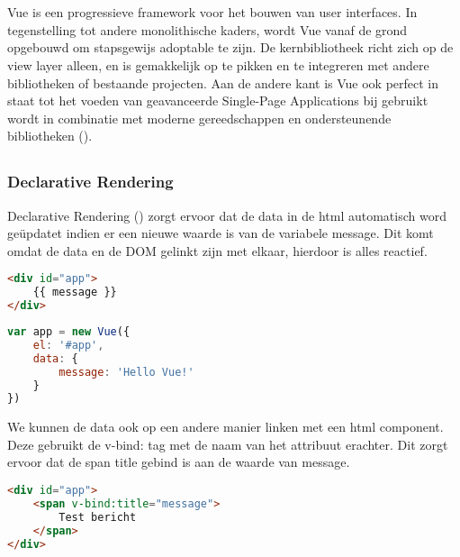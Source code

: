 \chapter{}
\label{ch:vue}
Vue is een progressieve framework voor het bouwen van user interfaces. In tegenstelling tot andere monolithische kaders, wordt Vue vanaf de grond opgebouwd om stapsgewijs adoptable te zijn. De kernbibliotheek richt zich op de view layer alleen, en is gemakkelijk op te pikken en te integreren met andere bibliotheken of bestaande projecten. Aan de andere kant is Vue ook perfect in staat tot het voeden van geavanceerde Single-Page Applications bij gebruikt wordt in combinatie met moderne gereedschappen en ondersteunende bibliotheken (\cite{VUEJS}).

\section{}
\label{sec:basisprincipes}

\subsection{Declarative Rendering}
Declarative Rendering (\cite{VUE_DECLARATIVERENDERING}) zorgt ervoor dat de data in de html automatisch word geüpdatet indien er een nieuwe waarde is van de variabele message. Dit komt omdat de data en de DOM gelinkt zijn met elkaar, hierdoor is alles reactief.

\begin{lstlisting}[caption=Declarative rendering html, language=HTML]
<div id="app">
	{{ message }}
</div>
\end{lstlisting}

\begin{lstlisting}[caption=Declarative rendering javascript, language=Javascript]
var app = new Vue({
	el: '#app',
	data: {
		message: 'Hello Vue!'
	}
})
\end{lstlisting}

We kunnen de data ook op een andere manier linken met een html component. Deze gebruikt de v-bind: tag met de naam van het attribuut erachter. Dit zorgt ervoor dat de span title gebind is aan de waarde van message.

\begin{lstlisting}[caption=Declarative rendering html alternatief, language=HTML]
<div id="app">
	<span v-bind:title="message">
		Test bericht
	</span>
</div>
\end{lstlisting}


